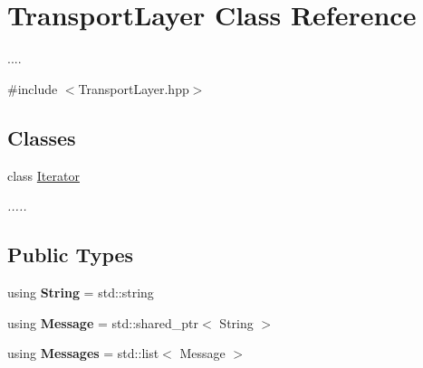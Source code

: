 \hypertarget{classTransportLayer}{}\section{Transport\+Layer Class Reference}
\label{classTransportLayer}


....  




{\ttfamily \#include $<$Transport\+Layer.\+hpp$>$}

\subsection*{Classes}
\begin{DoxyCompactItemize}
\item 
class \hyperlink{classTransportLayer_1_1Iterator}{Iterator}
\begin{DoxyCompactList}\small\item\em ..... \end{DoxyCompactList}\end{DoxyCompactItemize}
\subsection*{Public Types}
\begin{DoxyCompactItemize}
\item 
using {\bfseries String} = std\+::string\hypertarget{classTransportLayer_abb9ea2afa20f4277013ab8b9d870f3e4}{}\label{classTransportLayer_abb9ea2afa20f4277013ab8b9d870f3e4}

\item 
using {\bfseries Message} = std\+::shared\+\_\+ptr$<$ String $>$\hypertarget{classTransportLayer_af43e07ebb1a1725bc6f13fd4cc69d429}{}\label{classTransportLayer_af43e07ebb1a1725bc6f13fd4cc69d429}

\item 
using {\bfseries Messages} = std\+::list$<$ Message $>$\hypertarget{classTransportLayer_a0ff31cb0269d468ed1af9b9a6ecd34c4}{}\label{classTransportLayer_a0ff31cb0269d468ed1af9b9a6ecd34c4}

\end{DoxyCompactItemize}
